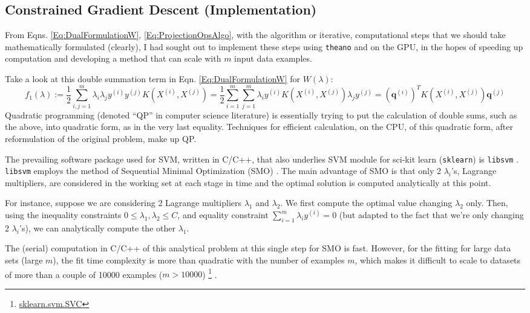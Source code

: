 \documentclass[10pt]{amsart}
\begin{document}
\begin{multicols*}{2}
\subsection{Constrained Gradient Descent (Implementation)}\label{Sec:ConstrainedGradDescImplementation}

From Eqns. \ref{Eq:DualFormulationW}, \ref{Eq:ProjectionOpsAlgo}, with the algorithm or iterative, computational steps that we should take mathematically formulated (clearly), I had sought out to implement these steps using \verb|theano| and on the GPU, in the hopes of speeding up computation and developing a method that can scale with $m$ input data examples.  

Take a look at this double summation term in Eqn. \ref{Eq:DualFormulationW} for $W(\lambda)$:
\begin{equation}\label{Eq:doublesumf_1}
f_1(\lambda) := \frac{1}{2} \sum_{i,j=1}^m \lambda_i \lambda_j y^{(i)} y^{(j)} K(X^{(i)},X^{(j)}) = \frac{1}{2} \sum_{i=1}^m\sum_{j=1}^m \lambda_i y^{(i)} K(X^{(i)},X^{(j)}) \lambda_j y^{(j)} = (\mathbf{q}^{(i)})^T K(X^{(i)},X^{(j)}) \mathbf{q}^{(j)}
\end{equation}
Quadratic programming (denoted ``QP'' in computer science literature) is essentially trying to put the calculation of double sums, such as the above, into quadratic form, as in the very last equality.  Techniques for efficient calculation, on the CPU, of this quadratic form, after reformulation of the original problem, make up QP.

The prevailing software package used for SVM, written in C/C++, that also underlies SVM module for sci-kit learn (\verb|sklearn|) \cite{Pedr2011} is \verb|libsvm| \cite{ChLi2011}.  \verb|libsvm| employs the method of Sequential Minimal Optimization (SMO) \cite{Pla1998}.  The main advantage of SMO is that only 2 $\lambda_i$'s, Lagrange multipliers, are considered in the working set at each stage in time and the optimal solution is computed analytically at this point.

For instance, suppose we are considering 2 Lagrange multipliers $\lambda_1$ and $\lambda_2$.  We first compute the optimal value changing $\lambda_2$ only.  Then, using the inequality constraints $0 \leq \lambda_1,\lambda_2\leq C$, and equality constraint $\sum_{i=1}^m \lambda_iy^{(i)} =0$ (but adapted to the fact that we're only changing 2 $\lambda_i$'s), we can analytically compute the other $\lambda_1$.

The (serial) computation in C/C++ of this analytical problem at this single step for SMO is fast.  However, for the fitting for large data sets (large $m$), the fit time complexity is more than quadratic with the number of examples $m$, which makes it difficult to scale to datasets of more than a couple of 10000 examples ($m>10000$) \footnote{\href{http://scikit-learn.org/stable/modules/generated/sklearn.svm.SVC.html\#sklearn.svm.SVC}{sklearn.svm.SVC}} \cite{Pedr2011}.  


\end{multicols*}
\end{document}
